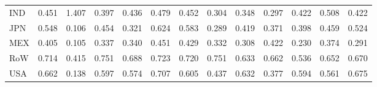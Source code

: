 \begin{table}[htbp]
\begin{tabular}{lcccccccccccc}
  IND & \textcolor[RGB]{138,89,117}{0.451} & \textcolor[RGB]{0,0,255}{1.407} & \textcolor[RGB]{191,124,64}{0.397} & \textcolor[RGB]{151,98,104}{0.436} & \textcolor[RGB]{110,72,144}{0.479} & \textcolor[RGB]{134,87,121}{0.452} & \textcolor[RGB]{225,146,30}{0.304} & \textcolor[RGB]{212,138,42}{0.348} & \textcolor[RGB]{230,148,26}{0.297} & \textcolor[RGB]{168,109,87}{0.422} & \textcolor[RGB]{102,66,153}{0.508} & \textcolor[RGB]{172,111,83}{0.422} \\ 
  JPN & \textcolor[RGB]{79,51,176}{0.548} & \textcolor[RGB]{251,162,4}{0.106} & \textcolor[RGB]{132,85,123}{0.454} & \textcolor[RGB]{221,143,34}{0.321} & \textcolor[RGB]{51,33,204}{0.624} & \textcolor[RGB]{68,44,187}{0.583} & \textcolor[RGB]{234,151,21}{0.289} & \textcolor[RGB]{174,113,81}{0.419} & \textcolor[RGB]{206,133,49}{0.371} & \textcolor[RGB]{189,122,66}{0.398} & \textcolor[RGB]{128,82,128}{0.459} & \textcolor[RGB]{94,61,162}{0.524} \\ 
  MEX & \textcolor[RGB]{187,121,68}{0.405} & \textcolor[RGB]{253,164,2}{0.105} & \textcolor[RGB]{217,140,38}{0.337} & \textcolor[RGB]{215,139,40}{0.340} & \textcolor[RGB]{140,91,115}{0.451} & \textcolor[RGB]{159,103,96}{0.429} & \textcolor[RGB]{219,142,36}{0.332} & \textcolor[RGB]{223,144,32}{0.308} & \textcolor[RGB]{170,110,85}{0.422} & \textcolor[RGB]{244,158,11}{0.230} & \textcolor[RGB]{200,129,55}{0.374} & \textcolor[RGB]{232,150,23}{0.291} \\ 
  RoW & \textcolor[RGB]{15,10,240}{0.714} & \textcolor[RGB]{176,114,79}{0.415} & \textcolor[RGB]{6,4,249}{0.751} & \textcolor[RGB]{23,15,232}{0.688} & \textcolor[RGB]{8,5,246}{0.723} & \textcolor[RGB]{13,8,242}{0.720} & \textcolor[RGB]{4,3,251}{0.751} & \textcolor[RGB]{45,29,210}{0.633} & \textcolor[RGB]{34,22,221}{0.662} & \textcolor[RGB]{85,55,170}{0.536} & \textcolor[RGB]{38,25,217}{0.652} & \textcolor[RGB]{28,18,227}{0.670} \\ 
  USA & \textcolor[RGB]{36,23,219}{0.662} & \textcolor[RGB]{246,160,8}{0.138} & \textcolor[RGB]{64,41,191}{0.597} & \textcolor[RGB]{72,47,183}{0.574} & \textcolor[RGB]{19,12,236}{0.707} & \textcolor[RGB]{62,40,193}{0.605} & \textcolor[RGB]{149,96,106}{0.437} & \textcolor[RGB]{47,30,208}{0.632} & \textcolor[RGB]{198,128,57}{0.377} & \textcolor[RGB]{66,43,189}{0.594} & \textcolor[RGB]{77,50,178}{0.561} & \textcolor[RGB]{25,16,230}{0.675} \\ 
   \hline
\end{tabular}
\end{table}
